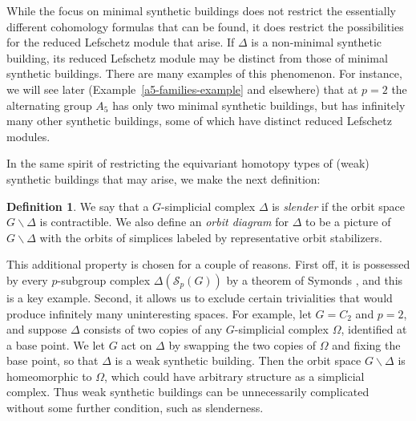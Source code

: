 \documentclass[12pt]{amsart}
\theoremstyle{plain}
\theoremstyle{definition}
\newtheorem{definition}[theorem]{Definition}
\theoremstyle{remark}
\numberwithin{equation}{section}
\newcommand{\SpCpx}[2]{\Delta(\mathcal{S}_{#2}(#1))}
\newcommand{\bs}{\backslash}
\begin{document}

While the focus on minimal synthetic buildings does not restrict the essentially different cohomology formulas that can be found, it does restrict the possibilities for the reduced Lefschetz module that arise. If $\Delta$ is a non-minimal synthetic building, its reduced Lefschetz module may be distinct from those of minimal synthetic buildings. There are many examples of this phenomenon. For instance, we will see later (Example~\ref{a5-families-example} and elsewhere) that at $p=2$ the alternating group $A_5$ has only two minimal synthetic buildings, but has infinitely many other synthetic buildings, some of which have distinct reduced Lefschetz modules.

In the same spirit of restricting the equivariant homotopy types of (weak) synthetic buildings that may arise, we make the next definition:
\begin{definition}
\label{slender-orbit-diagram-definitions}
We say that a $G$-simplicial complex $\Delta$ is \textit{slender} if  the orbit space $G\bs\Delta$ is contractible. We also define an \textit{orbit diagram} for $\Delta$ to be a picture of $G\backslash\Delta$ with the orbits of simplices labeled by representative orbit stabilizers.
\end{definition}

This additional property is chosen for a couple of reasons. First off, it is possessed by every $p$-subgroup complex $\SpCpx{G}{p}$ by a theorem of Symonds \cite{Sym1998}, and this is a key example.  Second, it allows us to exclude certain trivialities that would produce infinitely many uninteresting spaces. For example, let $G=C_2$ and $p=2$, and suppose $\Delta$ consists of two copies of any $G$-simplicial complex $\Omega$, identified at a base point. We let $G$ act on $\Delta$ by swapping the two copies of $\Omega$ and fixing the base point, so that $\Delta$ is a weak synthetic building. Then the orbit space $G\bs\Delta$ is homeomorphic to $\Omega$, which could have arbitrary structure as a simplicial complex. Thus weak synthetic buildings can be unnecessarily complicated without some further condition, such as slenderness.



\end{document}
